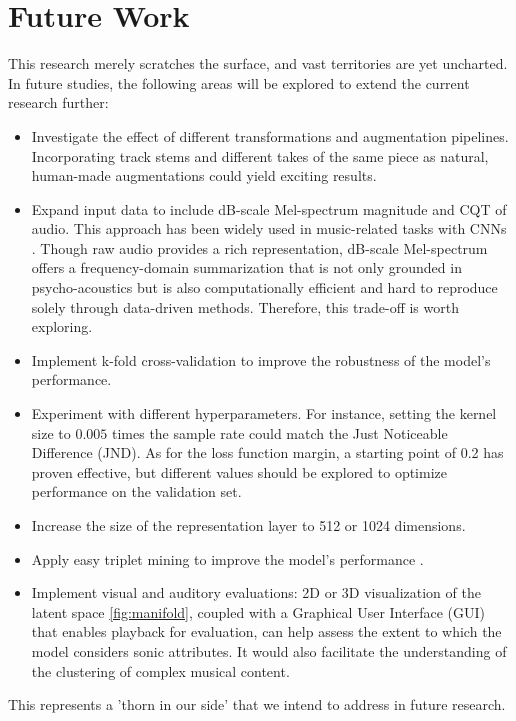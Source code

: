 \chapter{Future Work}

This research merely scratches the surface, and vast territories are yet uncharted. In future studies, the following areas will be explored to extend the current research further:

\begin{itemize}
  \item Investigate the effect of different transformations and augmentation pipelines. Incorporating track stems and different takes of the same piece as natural, human-made augmentations could yield exciting results.
  \item Expand input data to include dB-scale Mel-spectrum magnitude and CQT of audio. This approach has been widely used in music-related tasks with CNNs \cite{deepfeaturesegment, Kim2020OneStrategies}. Though raw audio provides a rich representation, dB-scale Mel-spectrum offers a frequency-domain summarization that is not only grounded in psycho-acoustics but is also computationally efficient and hard to reproduce solely through data-driven methods. Therefore, this trade-off is worth exploring.
  \item Implement k-fold cross-validation to improve the robustness of the model's performance.
  \item Experiment with different hyperparameters. For instance, setting the kernel size to $0.005$ times the sample rate could match the Just Noticeable Difference (JND). As for the loss function margin, a starting point of 0.2 has proven effective, but different values should be explored to optimize performance on the validation set.
  \item Increase the size of the representation layer to 512 or 1024 dimensions.
  \item Apply easy triplet mining to improve the model's performance \cite{XuanImprovedMining}.
  \item Implement visual and auditory evaluations: 2D or 3D visualization of the latent space \ref{fig:manifold}, coupled with a Graphical User Interface (GUI) that enables playback for evaluation, can help assess the extent to which the model considers sonic attributes. It would also facilitate the understanding of the clustering of complex musical content. 
\end{itemize}

This represents a 'thorn in our side' that we intend to address in future research.

\newpage